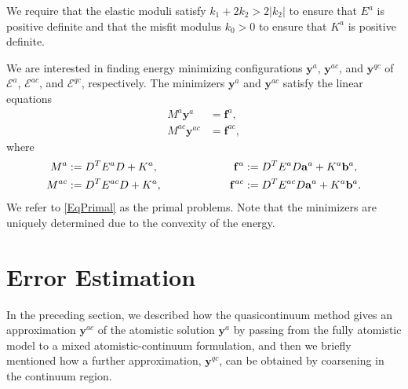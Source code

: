 \documentclass[11pt,reqno,oneside]{amsart}
\numberwithin{equation}{section}
\begin{document}
We require that the elastic moduli satisfy
$k_1+2k_2>2|k_2|$ to ensure that $E^a$ is positive definite
and that the misfit modulus $k_0>0$ to ensure that
$K^a$ is positive definite.

We are interested in finding energy minimizing configurations ${\mathbf{y}}^a$, ${\mathbf{y}}^{ac}$, and ${\mathbf{y}}^{qc}$ of ${\mathcal{E}}^a$, ${\mathcal{E}}^{ac}$, and ${\mathcal{E}}^{qc}$, respectively.
The minimizers ${\mathbf{y}}^a$ and ${\mathbf{y}}^{ac}$ satisfy the linear equations
\begin{equation} \label{EqPrimal}
\begin{split}
  M^a    {\mathbf{y}}^a   & = {\mathbf{f}}^a,   \\
  M^{ac} {\mathbf{y}}^{ac} & = {\mathbf{f}}^{ac}, 
\end{split}
\end{equation}
where
\begin{equation} \label{EqMfDef}
\begin{aligned}
  M^a         & := D^T E^a D + K^a, &   \hspace{20mm}
  {\mathbf{f}}^a    & := D^T E^a D {\mathbf{a}}^a + K^a {\mathbf{b}}^a, \\
  M^{ac}      & := D^T E^{ac} D + K^a, &
  {\mathbf{f}}^{ac} & := D^T E^{ac} D {\mathbf{a}}^a + K^a {\mathbf{b}}^a. 
\end{aligned}
\end{equation}
We refer to \eqref{EqPrimal} as the primal problems.
Note that the minimizers are uniquely determined due to the convexity of
the energy.

        

\section{Error Estimation}  \label{SecErrorEst}

In the preceding section, we described how the quasicontinuum
method gives an approximation ${\mathbf{y}}^{ac}$ of the atomistic
solution ${\mathbf{y}}^a$ by passing from the fully atomistic model to a
mixed atomistic-continuum formulation, and then we briefly
mentioned how a further approximation, ${\mathbf{y}}^{qc}$, can be
obtained by coarsening in the continuum region.
\end{document}
